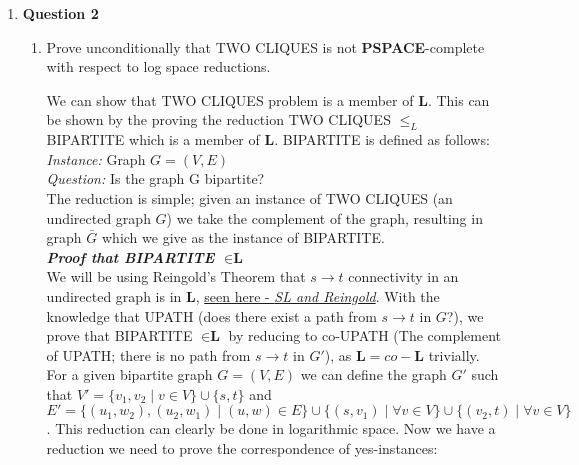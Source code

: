 \documentclass[12pt]{article}
\begin{document}
\begin{enumerate}
\begin{enumerate}
\end{enumerate}
\item \textbf{Question 2}
\begin{enumerate}
\item Prove unconditionally that TWO CLIQUES is not \textbf{PSPACE}-complete with respect to log space reductions.\par
We can show that TWO CLIQUES problem is a member of $\textbf{L} $. This can be shown by the proving the reduction TWO CLIQUES $\leq _{L}$ BIPARTITE which is a member of $\textbf{L} $. BIPARTITE is defined as follows:\\
\textit{Instance:} Graph $G=(V,E)$\\
\textit{Question:} Is the graph G bipartite?\\
The reduction is simple; given an instance of TWO CLIQUES (an undirected graph $G$) we take the complement of the graph, resulting in graph $\bar{G}$ which we give as the instance of BIPARTITE.\\
\textit{\textbf{Proof that BIPARTITE $\in \textbf{L} $}}\\
We will be using Reingold's Theorem that $s\rightarrow t$ connectivity in an undirected graph is in $\textbf{L} $, \href{https://en.wikipedia.org/wiki/SL_(complexity)}{seen here - \textit{SL and Reingold}}. With the knowledge that UPATH (does there exist a path from $s\rightarrow t$ in $G$?), we prove that BIPARTITE $\in \textbf{L} $ by reducing to co-UPATH (The complement of UPATH; there is no path from $s\rightarrow t$ in $G'$), as $\textbf{L} = co-\textbf{L} $ trivially. \\
For a given bipartite graph $G=(V,E)$ we can define the graph $G'$ such that $V'=\{v_1,v_2\mid v \in V\} \cup \{s,t\} $ and $E'=\{(u_1,w_2),(u_2,w_1) \mid (u,w)\in E\} \cup \{(s,v_1) \mid \forall v \in V\} \cup \{(v_2,t) \mid \forall v \in V\}$.
This reduction can clearly be done in logarithmic space. Now we have a reduction we need to prove the correspondence of yes-instances: \\

\end{enumerate}
\end{enumerate}
\end{document}
